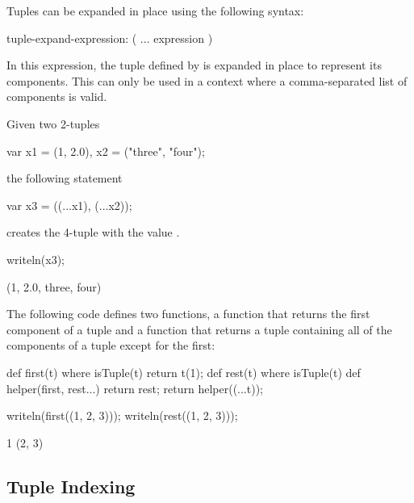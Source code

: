 Tuples can be expanded in place using the following syntax:
\begin{syntax}
tuple-expand-expression:
  ( ... expression )
\end{syntax}
In this expression, the tuple defined by  is expanded
in place to represent its components.  This can only be used in a
context where a comma-separated list of components is valid.

\begin{example}
\begin{chapelpre}
\end{chapelpre}
Given two 2-tuples
\begin{chapel}
var x1 = (1, 2.0), x2 = ("three", "four");
\end{chapel}
the following statement
\begin{chapel}
var x3 = ((...x1), (...x2));
\end{chapel}
creates the 4-tuple  with the value .
\begin{chapelpost}
writeln(x3);
\end{chapelpost}
\begin{chapeloutput}
(1, 2.0, three, four)
\end{chapeloutput}
\end{example}

\begin{example}
\begin{chapelpre}
\end{chapelpre}
The following code defines two functions, a function  that
returns the first component of a tuple and a function  that
returns a tuple containing all of the components of a tuple except for
the first:
\begin{chapel}
def first(t) where isTuple(t) {
  return t(1);
}
def rest(t) where isTuple(t) {
  def helper(first, rest...)
    return rest;
  return helper((...t));
}
\end{chapel}
\begin{chapelpost}
writeln(first((1, 2, 3)));
writeln(rest((1, 2, 3)));
\end{chapelpost}
\begin{chapeloutput}
1
(2, 3)
\end{chapeloutput}
\end{example}

\subsection{Tuple Indexing}
\label{Tuple_Indexing}

